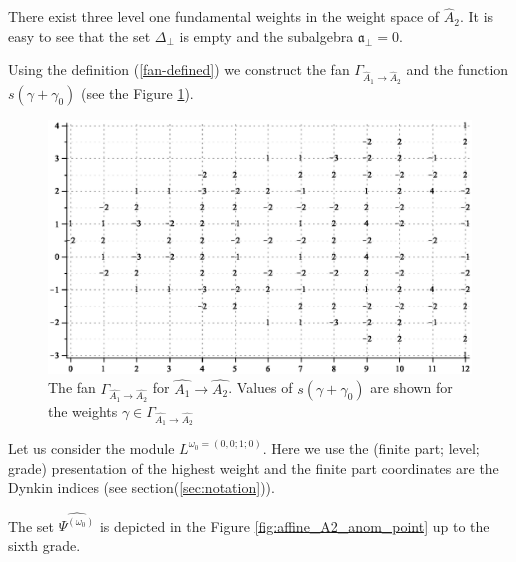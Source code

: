 \documentclass[12pt]{iopart}
\theoremstyle{definition}
\begin{document}
There exist three level one fundamental weights in the weight space of $\hat{A}_2$.
It is easy to see that the set $\Delta_{\bot}$ is empty and the subalgebra $\mathfrak{a}_{\bot}=0$.

Using the definition (\ref{fan-defined})  we construct the fan $\Gamma_{\hat A_1\to\hat A_2}$
and the function $s(\gamma+\gamma_0)$ (see the Figure \ref{fig:AffineA2A1Fan}).

\begin{figure}[h!bt]
  \centering
  \includegraphics[width=135mm]{figure6.eps}

  \caption{The fan $\Gamma_{\hat{A_1}\longrightarrow \hat{A_2}}$ for $\hat{A_1}\longrightarrow \hat{A_2}$. Values of  $s(\gamma+\gamma_0)$ are shown for the weights $\gamma\in \Gamma_{\hat{A_1}\longrightarrow \hat{A_2}}$}
  \label{fig:AffineA2A1Fan}
\end{figure}

Let us consider the module $L^{\omega_0=(0,0;1;0)}$. Here we use the (finite part; level; grade)
presentation of the highest weight and the finite part
coordinates are the Dynkin indices (see section(\ref{sec:notation})).

The set $\widehat{\Psi^{(\omega_0)}}$  is depicted in the Figure
\ref{fig:affine_A2_anom_point} up to the sixth grade.
\end{document}
